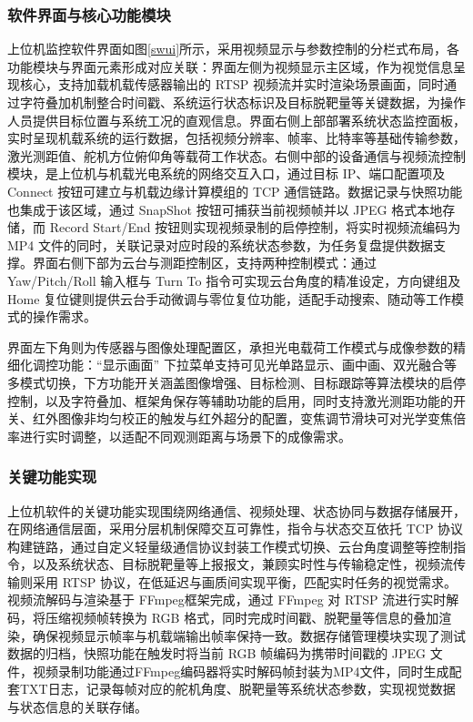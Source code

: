 \subsubsection{软件界面与核心功能模块}
上位机监控软件界面如图\ref{swui}所示，采用视频显示与参数控制的分栏式布局，各功能模块与界面元素形成对应关联：界面左侧为视频显示主区域，作为视觉信息呈现核心，支持加载机载传感器输出的 RTSP 视频流并实时渲染场景画面，同时通过字符叠加机制整合时间戳、系统运行状态标识及目标脱靶量等关键数据，为操作人员提供目标位置与系统工况的直观信息。界面右侧上部部署系统状态监控面板，实时呈现机载系统的运行数据，包括视频分辨率、帧率、比特率等基础传输参数，激光测距值、舵机方位俯仰角等载荷工作状态。右侧中部的设备通信与视频流控制模块，是上位机与机载光电系统的网络交互入口，通过目标 IP、端口配置项及 Connect 按钮可建立与机载边缘计算模组的 TCP 通信链路。数据记录与快照功能也集成于该区域，通过 SnapShot 按钮可捕获当前视频帧并以 JPEG 格式本地存储，而 Record Start/End 按钮则实现视频录制的启停控制，将实时视频流编码为 MP4 文件的同时，关联记录对应时段的系统状态参数，为任务复盘提供数据支撑。界面右侧下部为云台与测距控制区，支持两种控制模式：通过 Yaw/Pitch/Roll 输入框与 Turn To 指令可实现云台角度的精准设定，方向键组及 Home 复位键则提供云台手动微调与零位复位功能，适配手动搜索、随动等工作模式的操作需求。

界面左下角则为传感器与图像处理配置区，承担光电载荷工作模式与成像参数的精细化调控功能：“显示画面” 下拉菜单支持可见光单路显示、画中画、双光融合等多模式切换，下方功能开关涵盖图像增强、目标检测、目标跟踪等算法模块的启停控制，以及字符叠加、框架角保存等辅助功能的启用，同时支持激光测距功能的开关、红外图像非均匀校正的触发与红外超分的配置，变焦调节滑块可对光学变焦倍率进行实时调整，以适配不同观测距离与场景下的成像需求。

\subsubsection{关键功能实现}
上位机软件的关键功能实现围绕网络通信、视频处理、状态协同与数据存储展开，在网络通信层面，采用分层机制保障交互可靠性，指令与状态交互依托 TCP 协议构建链路，通过自定义轻量级通信协议封装工作模式切换、云台角度调整等控制指令，以及系统状态、目标脱靶量等上报报文，兼顾实时性与传输稳定性，视频流传输则采用 RTSP 协议，在低延迟与画质间实现平衡，匹配实时任务的视觉需求。视频流解码与渲染基于 FFmpeg框架完成，通过 FFmpeg 对 RTSP 流进行实时解码，将压缩视频帧转换为 RGB 格式，同时完成时间戳、脱靶量等信息的叠加渲染，确保视频显示帧率与机载端输出帧率保持一致。数据存储管理模块实现了测试数据的归档，快照功能在触发时将当前 RGB 帧编码为携带时间戳的 JPEG 文件，视频录制功能通过FFmpeg编码器将实时解码帧封装为MP4文件，同时生成配套TXT日志，记录每帧对应的舵机角度、脱靶量等系统状态参数，实现视觉数据与状态信息的关联存储。

